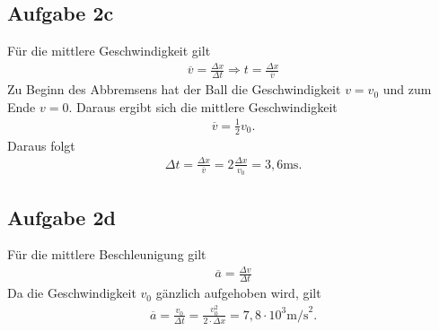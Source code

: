 \documentclass[a4paper,11pt]{article}
\begin{document}
\subsection*{Aufgabe 2c}
Für die mittlere Geschwindigkeit gilt
\begin{align*}
  \overline{v} = \frac{\Delta x}{\Delta t} \Rightarrow t = \frac{\Delta x}{\overline{v}}
\end{align*}
Zu Beginn des Abbremsens hat der Ball die Geschwindigkeit $v = v_0$ und zum Ende $v = 0$. Daraus ergibt sich die mittlere Geschwindigkeit
\begin{align*}
  \overline{v} = \frac{1}{2} v_0 \mbox{.}
\end{align*}
Daraus folgt
\begin{align*}
  \Delta t = \frac{\Delta x}{\overline{v}} = 2\frac{\Delta x}{v_0} = 3,6 \mbox{ms.}
\end{align*}

\subsection*{Aufgabe 2d}
Für die mittlere Beschleunigung gilt
\begin{align*}
  \overline{a} = \frac{\Delta v}{\Delta t}
\end{align*}
Da die Geschwindigkeit $v_0$ gänzlich aufgehoben wird, gilt
\begin{align*}
  \overline{a} = \frac{v_0}{\Delta t} = \frac{v_0^2}{2\cdot\Delta x} = 7,8\cdot 10^3 \mbox{m/s}^2\mbox{.}
\end{align*}
\end{document}
